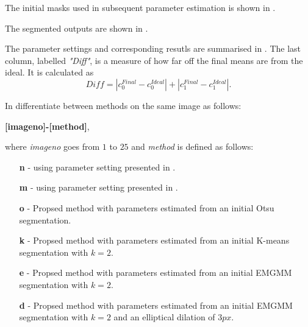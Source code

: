 The initial masks used in subsequent parameter estimation is shown in .

The segmented outputs are shown in .

The parameter settings and corresponding resutls are summarised in . The last column, labelled \textit{"Diff"}, is a measure of how far off the final means are from the ideal. It is calculated as 
\begin{equation*}
	Diff = |c_{0}^{Final}-c_{0}^{Ideal}| + |c_{1}^{Final}-c_{1}^{Ideal}|.
\end{equation*}

In  differentiate between methods on the same image as follows:

\textbf{[imageno]-[method]}, 

where \textit{imageno} goes from $1$ to $25$ and \textit{method} is defined as follows:
\begin{enumerate}
	\item [\textbf{n}] - using parameter setting presented in \citep{ElZehiry2007}.
	\item [\textbf{m}] - using parameter setting presented in \citep{Maska2013}.
	\item [\textbf{o}] - Propsed method with parameters estimated from an initial Otsu segmentation.
	\item [\textbf{k}] - Propsed method with parameters estimated from an initial K-means segmentation with $k=2$.
	\item [\textbf{e}] - Propsed method with parameters estimated from an initial EMGMM segmentation with $k=2$.
	\item [\textbf{d}] - Propsed method with parameters estimated from an initial EMGMM segmentation with $k=2$ and an elliptical dilation of $3px$.
\end{enumerate}


